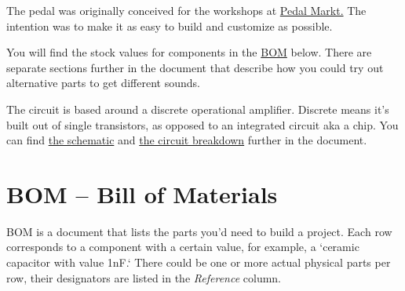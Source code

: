 \documentclass[a4paper,12pt]{article}
\begin{document}
The pedal was originally conceived for the workshops at
\href{https://pedalmarkt.com}{Pedal Markt.} The intention
was  to make it as easy to build and customize as possible.

You will find the stock values for components in the
\hyperref[sec:bom]{BOM} below. There are separate sections
further in the document that describe how you could try out
alternative parts to get different sounds.

The circuit is based around a discrete operational
amplifier. Discrete means it's built out of single
transistors, as opposed to an integrated circuit aka a chip.
You can find \hyperref[sec:schematic]{the schematic} and
\hyperref[sec:circuit]{the circuit breakdown} further in the
document.

\pagebreak

\section{BOM – Bill of Materials}
\label{sec:bom}

BOM is a document that lists the parts you'd need to build a
project. Each row corresponds to a component with a certain
value, for example, a `ceramic capacitor with value 1nF.`
There could be one or more actual physical parts per
row, their designators are listed in the \textit{Reference}
column.




\end{document}
